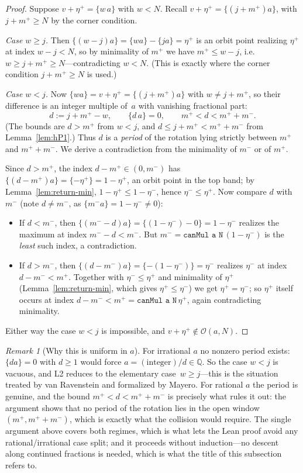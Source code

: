 \documentclass[11pt,reqno]{amsart}
\theoremstyle{plain}
\theoremstyle{definition}
\theoremstyle{remark}
\newtheorem{remark}[theorem]{Remark}
\newcommand{\Q}{\mathbb{Q}}
\newcommand{\fract}[1]{\{#1\}}
\newcommand{\etap}{\eta^{+}}
\newcommand{\etam}{\eta^{-}}
\newcommand{\mpl}{m^{+}}
\newcommand{\mmi}{m^{-}}
\newcommand{\orb}{\mathcal{O}}
\newcommand{\code}[1]{\texttt{#1}}
\begin{document}
\begin{proof}
Suppose $v+\etap=\fract{w\,a}$ with $w<N$.  Recall
$v+\etap=\fract{(j+\mpl)a}$, with $j+\mpl\ge N$ by the corner condition.

\emph{Case $w\ge j$.}  Then $\fract{(w-j)a}=\fract{w a}-\fract{j a}=\etap$ is an
orbit point realizing $\etap$ at index $w-j<N$, so by minimality of $\mpl$ we
have $\mpl\le w-j$, i.e.\ $w\ge j+\mpl\ge N$---contradicting $w<N$.  (This is
exactly where the corner condition $j+\mpl\ge N$ is used.)

\emph{Case $w<j$.}  Now $\fract{w a}=v+\etap=\fract{(j+\mpl)a}$ with
$w\ne j+\mpl$, so their difference is an integer multiple of~$a$ with vanishing
fractional part:
\[
  d := j+\mpl-w, \qquad \fract{d\,a}=0, \qquad \mpl<d<\mpl+\mmi .
\]
(The bounds are $d>\mpl$ from $w<j$, and $d\le j+\mpl<\mpl+\mmi$ from
Lemma~\ref{lem:hP1}.)  Thus $d$ is a \emph{period} of the rotation lying
strictly between $\mpl$ and $\mpl+\mmi$.  We derive a contradiction from the
minimality of $\mmi$ or of $\mpl$.

Since $d>\mpl$, the index $d-\mpl\in(0,\mmi)$ has
$\fract{(d-\mpl)a}=\fract{-\etap}=1-\etap$, an orbit point in the top band; by
Lemma~\ref{lem:return-min}, $1-\etap\le 1-\etam$, hence $\etam\le\etap$.  Now
compare $d$ with $\mmi$ (note $d\ne\mmi$, as $\fract{\mmi a}=1-\etam\ne0$):
\begin{itemize}
\item If $d<\mmi$, then $\fract{(\mmi-d)a}=\fract{(1-\etam)-0}=1-\etam$ realizes
the maximum at index $\mmi-d<\mmi$.  But $\mmi=\code{canMul a N}\,(1-\etam)$ is
the \emph{least} such index, a contradiction.
\item If $d>\mmi$, then $\fract{(d-\mmi)a}=\fract{-(1-\etam)}=\etam$ realizes
$\etam$ at index $d-\mmi<\mpl$.  Together with $\etam\le\etap$ and minimality of
$\etap$ (Lemma~\ref{lem:return-min}, which gives $\etap\le\etam$) we get
$\etap=\etam$; so $\etap$ itself occurs at index $d-\mmi<\mpl=\code{canMul a
N}\,\etap$, again contradicting minimality.
\end{itemize}
Either way the case $w<j$ is impossible, and $v+\etap\notin\orb(a,N)$.
\end{proof}

\begin{remark}[Why this is uniform in $a$]\label{rmk:uniform}
For irrational $a$ no nonzero period exists: $\fract{d a}=0$ with $d\ge1$ would
force $a=(\text{integer})/d\in\Q$.  So the case $w<j$ is vacuous, and L2 reduces
to the elementary case~$w\ge j$---this is the situation treated by van
Ravenstein and formalized by Mayero.  For rational $a$ the period is genuine,
and the bound $\mpl<d<\mpl+\mmi$ is precisely what rules it out: the argument
shows that no period of the rotation lies in the open window $(\mpl,\mpl+\mmi)$,
which is exactly what the collision would require.  The single argument above
covers both regimes, which is what lets the Lean proof avoid any
rational/irrational case split; and it proceeds without induction---no descent
along continued fractions is needed, which is what the title of this
subsection refers to.
\end{remark}
\end{document}
